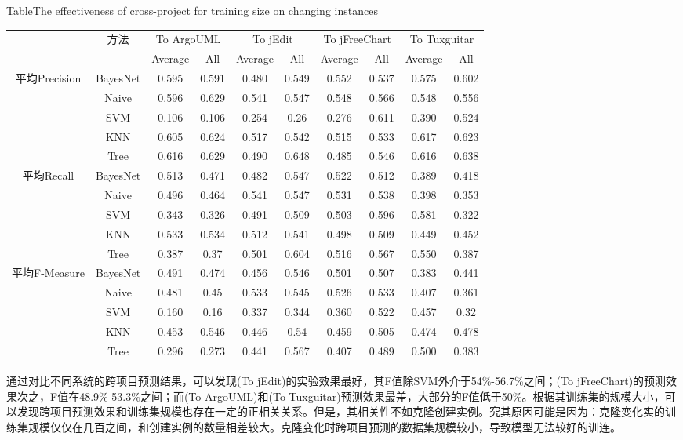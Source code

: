 \begin{table} [htbp]
{Table$\!$}{The effectiveness of cross-project for training size on changing instances}
\vspace{0.5em}
\centering
\footnotesize
\begin{tabular}{cccccccccc}
\toprule[1.5pt]
~\multirow{2}{*}{指标}&\multirow{2}{*}{方法}&\multicolumn{2}{c}{To ArgoUML}&\multicolumn{2}{c}{To jEdit}&\multicolumn{2}{c}{To jFreeChart}&\multicolumn{2}{c}{To  Tuxguitar}\\
\cline{3-10}
~&~&{Average}&{All}&{Average}&{All}&{Average}&{All}&{Average}&{All}\\
\midrule[1pt]
\multirow{5}{*}{平均Precision}
&BayesNet&	0.595&	0.591&0.480&	0.549&	0.552&	0.537&	0.575&	0.602\\
&Naive&	0.596&	0.629	&0.541&	0.547&	0.548&	0.566&	0.548&	0.556\\
&SVM&	0.106&	0.106&	0.254&	0.26&	0.276	&0.611&	0.390&	0.524\\
&KNN&	0.605&	0.624&	0.517&	0.542&	0.515&	0.533&	0.617&	0.623\\
&Tree	&0.616&	0.629&	0.490&	0.648&	0.485	&0.546	&0.616	&0.638\\
\hline
\multirow{5}{*}{平均Recall}								
&BayesNet&	0.513&	0.471&	0.482&	0.547&	0.522	&0.512&	0.389	&0.418\\
&Naive&	0.496&	0.464&	0.541	&0.547&0.531	&0.538&0.398	&0.353\\
&SVM&	0.343&	0.326&	0.491&	0.509&	0.503&	0.596&	0.581&	0.322\\
&KNN&	0.533&	0.534&	0.512	&0.541&	0.498&	0.509&	0.449&	0.452\\
&Tree	&0.387&	0.37&	0.501	&0.604&	0.516&	0.567&	0.550&	0.387\\
\hline
\multirow{5}{*}{平均F-Measure}								
&BayesNet&	0.491	&0.474&	0.456&	0.546	&0.501&	0.507&	0.383	&0.441\\
&Naive&	0.481&	0.45&	0.533&	0.545&	0.526&	0.533&	0.407&	0.361\\
&SVM&	0.160	&0.16	&0.337	&0.344	&0.360	&0.522	&0.457	&0.32\\
&KNN&	0.453&	0.546	&0.446&	0.54&	0.459	&0.505	&0.474&	0.478\\
&Tree&	0.296	&0.273	&0.441&	0.567	&0.407&	0.489	&0.500&	0.383\\
\bottomrule[1.5pt]
\end{tabular}
\end{table}

通过对比不同系统的跨项目预测结果，可以发现(To jEdit)的实验效果最好，其F值除SVM外介于54\%-56.7\%之间；(To jFreeChart)的预测效果次之，F值在48.9\%-53.3\%之间；而(To ArgoUML)和(To Tuxguitar)预测效果最差，大部分的F值低于50\%。根据其训练集的规模大小，可以发现跨项目预测效果和训练集规模也存在一定的正相关关系。但是，其相关性不如克隆创建实例。究其原因可能是因为：克隆变化实的训练集规模仅仅在几百之间，和创建实例的数量相差较大。克隆变化时跨项目预测的数据集规模较小，导致模型无法较好的训连。%

